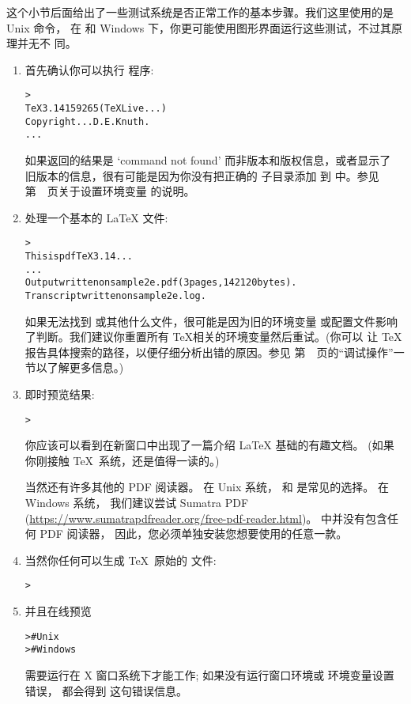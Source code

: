 \documentclass{article}
\begin{document}
这个小节后面给出了一些测试系统是否正常工作的基本步骤。我们这里使用的是 Unix 命令，
在 \macOS{} 和 Windows 下，你更可能使用图形界面运行这些测试，不过其原理并无不
同。

\begin{enumerate}

\item 首先确认你可以执行  程序: 
\begin{alltt}
> 
TeX 3.14159265 (TeX Live ...)
Copyright ... D.E. Knuth.
...
\end{alltt}
如果返回的结果是 `command not found' 而非版本和版权信息，或者显示了
旧版本的信息，很有可能是因为你没有把正确的  子目录添加
到  中。参见第~\pageref{sec:env}~页关于设置环境变量
的说明。

\item 处理一个基本的 \LaTeX{} 文件: 
\begin{alltt}
> 
This is pdfTeX 3.14...
...
Output written on sample2e.pdf (3 pages, 142120 bytes).
Transcript written on sample2e.log.
\end{alltt}
如果无法找到  或其他什么文件，很可能是因为旧的环境变量
或配置文件影响了判断。我们建议你重置所有 \TeX 相关的环境变量然后重试。(你可以
让 \TeX{} 报告具体搜索的路径，以便仔细分析出错的原因。参见
第~\pageref{sec:debugging}~页的``调试操作''一节以了解更多信息。)

\item 即时预览结果: 
\begin{alltt}
> 
\end{alltt}
你应该可以看到在新窗口中出现了一篇介绍 \LaTeX{} 基础的有趣文档。
(如果你刚接触 \TeX\ 系统，还是值得一读的。) 

当然还有许多其他的 PDF 阅读器。
在 Unix 系统，
 和  是常见的选择。
在 Windows 系统，
我们建议尝试 Sumatra PDF
(\url{https://www.sumatrapdfreader.org/free-pdf-reader.html})。
\TL{} 中并没有包含任何 PDF 阅读器，
因此，您必须单独安装您想要使用的任意一款。

\item 当然你任何可以生成 \TeX\ 原始的 \dvi{} 文件: 
\begin{alltt}
> 
\end{alltt}

\item 并且在线预览 \dvi{}
\begin{alltt}
>     # Unix
>   # Windows
\end{alltt}
 需要运行在 X 窗口系统下才能工作; 
如果没有运行窗口环境或  环境变量设置错误，
都会得到  这句错误信息。


\end{enumerate}
\end{document}
